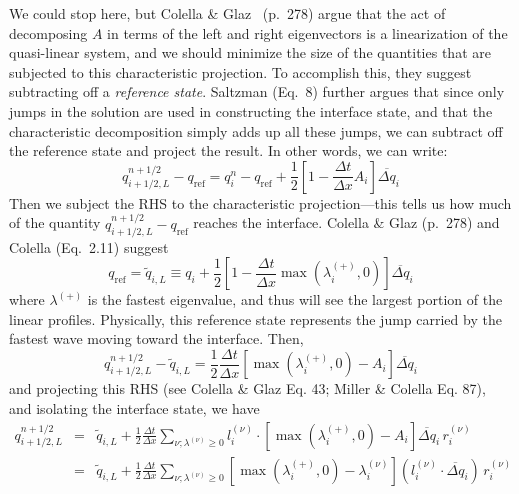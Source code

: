 \documentclass[11pt]{article}
\newcommand{\evp}{{(+)}}
\begin{document}
We could stop here, but Colella \& Glaz~\cite{colellaglaz:1985}
(p.\ 278) argue that the act of decomposing $A$ in terms of the left
and right eigenvectors is a linearization of the quasi-linear system,
and we should minimize the size of the quantities that are subjected
to this characteristic projection.  To accomplish this, they suggest
subtracting off a {\em reference state}.  Saltzman (Eq.\ 8) further
argues that since only jumps in the solution are used in constructing
the interface state, and that the characteristic decomposition simply adds
up all these jumps, we can subtract off the reference state and
project the result.  In other words, we can write:
\begin{equation}
q_{i+1/2,L}^{n+1/2} - q_\mathrm{ref} = q_i^n - q_\mathrm{ref} +  
  \frac{1}{2} \left [ 1 - \frac{\Delta t}{\Delta x} A_i \right ] \overline{\Delta q}_i
\label{eq:lin_decomp}
\end{equation}
Then we subject the RHS to the characteristic projection---this tells
us how much of the quantity $q_{i+1/2,L}^{n+1/2} - q_\mathrm{ref}$
reaches the interface.  Colella \& Glaz (p.\ 278) and Colella
(Eq.\ 2.11) suggest
\begin{equation}
q_\mathrm{ref} = \tilde{q}_{i,L} \equiv q_i + 
   \frac{1}{2} \left [ 1 - \frac{\Delta t}{\Delta x}
 \max(\lambda_i^\evp, 0) \right ] \overline{\Delta q}_i \label{eq:qref}
\end{equation}
where $\lambda^\evp$ is the fastest eigenvalue, and thus will see
the largest portion of the linear profiles.  Physically, this
reference state represents the jump carried by the fastest wave
moving toward the interface.  Then,
\begin{equation}
q_{i+1/2,L}^{n+1/2} - \tilde{q}_{i,L} = \frac{1}{2} \frac{\Delta t}{\Delta x}
  \left [ \max(\lambda_i^\evp,0) - A_i \right ] \overline{\Delta q}_i
\end{equation}
and projecting this RHS (see Colella \& Glaz Eq. 43; Miller \& Colella Eq. 87),
and isolating the interface state, we have
\begin{eqnarray}
q_{i+1/2,L}^{n+1/2} &=& \tilde{q}_{i,L} + \frac{1}{2} \frac{\Delta t}{\Delta x}
       \sum_{\nu; \lambda^{(\nu)} \ge 0} l_i^{(\nu)} \cdot \left [ \max(\lambda_i^\evp,0) - A_i \right ]
                                           \overline{\Delta q}_i \, r_i^{(\nu)} \\
                    &=& \tilde{q}_{i,L} + \frac{1}{2} \frac{\Delta t}{\Delta x}
       \sum_{\nu; \lambda^{(\nu)} \ge 0} \left [ \max(\lambda_i^\evp,0) - \lambda_i^{(\nu)} \right ]
                                          (l_i^{(\nu)} \cdot \overline{\Delta q}_i) \, r_i^{(\nu)}
\end{eqnarray}
\end{document}
